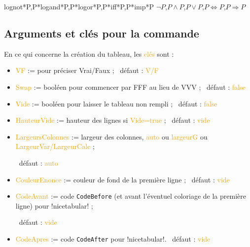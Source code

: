 \documentclass[french,a4paper,11pt]{article}
\newcommand\Cle[1]{{\small\sffamily\textlangle \textcolor{orange}{#1}\textrangle}}
\begin{document}
{{\begin{DemoCode}[]
%
	{lognot*P,P*logand*P,P*logor*P,P*iff*P,P*imp*P}%
	{$\lnot P$,$P \land P$,$P \lor P$,$P \Leftrightarrow P$,$P \Rightarrow P$}
\end{DemoCode}

\begin{DemoCode}[]
\end{DemoCode}

\subsection{Arguments et clés pour la commande}

\begin{DemoCode}
\end{DemoCode}

\begin{tipblock}
En ce qui concerne la création du tableau, les \Cle{clés} sont :

\begin{itemize}
	\item \Cle{VF} := pour préciser Vrai/Faux ; \hfill~défaut : \Cle{V/F}
	\item \Cle{Swap} := booléen pour commencer par FFF au lieu de VVV ; \hfill~défaut : \Cle{false}
	\item \Cle{Vide} := booléen pour laisser le tableau non rempli ; \hfill~défaut : \Cle{false}
	\item \Cle{HauteurVide} := hauteur des lignes si \Cle{Vide=true} ; \hfill~défaut : \Cle{vide}
	\item \Cle{LargeursColonnes} := largeur des colonnes, \Cle{auto} ou \Cle{largeurG} ou \Cle{LargeurVar/LargeurCalc} ;
	
	\hfill~défaut : \Cle{auto}
	\item \Cle{CouleurEnonce} := couleur de fond de la première ligne ; \hfill~défaut : \Cle{vide}
	\item \Cle{CodeAvant} := code \texttt{CodeBefore} (et avant l'éventuel coloriage de la première ligne) pour \motcletex!nicetabular! ;
	
	\hfill~défaut : \Cle{vide}
	\item \Cle{CodeApres} := code \texttt{CodeAfter} pour \motcletex!nicetabular!. \hfill~défaut : \Cle{vide}
\end{itemize}


\end{tipblock}}}
\end{document}
